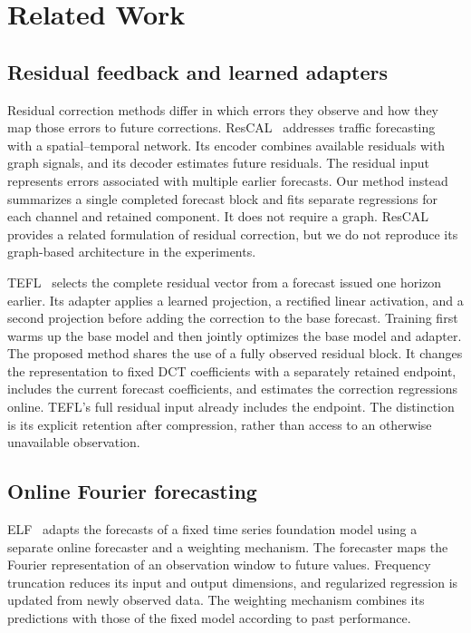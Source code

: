 \section{Related Work}
\label{sec:related_work}

\subsection{Residual feedback and learned adapters}
Residual correction methods differ in which errors they observe and how they map those errors to future corrections. ResCAL~\cite{rescal2022} addresses traffic forecasting with a spatial--temporal network. Its encoder combines available residuals with graph signals, and its decoder estimates future residuals. The residual input represents errors associated with multiple earlier forecasts. Our method instead summarizes a single completed forecast block and fits separate regressions for each channel and retained component. It does not require a graph. ResCAL provides a related formulation of residual correction, but we do not reproduce its graph-based architecture in the experiments.

TEFL~\cite{tefl2026} selects the complete residual vector from a forecast issued one horizon earlier. Its adapter applies a learned projection, a rectified linear activation, and a second projection before adding the correction to the base forecast. Training first warms up the base model and then jointly optimizes the base model and adapter. The proposed method shares the use of a fully observed residual block. It changes the representation to fixed DCT coefficients with a separately retained endpoint, includes the current forecast coefficients, and estimates the correction regressions online. TEFL's full residual input already includes the endpoint. The distinction is its explicit retention after compression, rather than access to an otherwise unavailable observation.

\subsection{Online Fourier forecasting}
ELF~\cite{elf2025} adapts the forecasts of a fixed time series foundation model using a separate online forecaster and a weighting mechanism. The forecaster maps the Fourier representation of an observation window to future values. Frequency truncation reduces its input and output dimensions, and regularized regression is updated from newly observed data. The weighting mechanism combines its predictions with those of the fixed model according to past performance.

